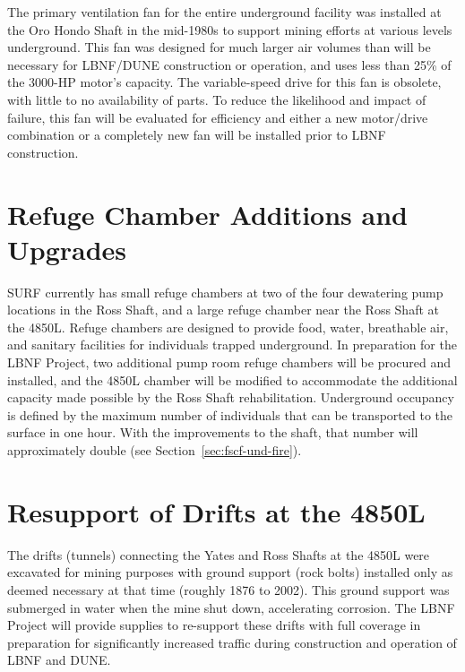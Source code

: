 The primary ventilation fan for the entire underground facility was installed at the Oro Hondo Shaft in the mid-1980s to support mining efforts at various levels underground.  This fan was designed for much larger air volumes than will be necessary for LBNF/DUNE construction or operation, and uses less than 25\% of the 3000-HP motor's capacity.  The variable-speed drive for this fan is obsolete, with little to no  availability of parts.  To reduce the likelihood and impact of failure, this fan will be evaluated for efficiency and either a new motor/drive combination or a completely new fan will be installed prior to LBNF construction.
 
\section{Refuge Chamber Additions and Upgrades}
\label{ch:fscf-site-prep-refuge}

SURF currently has small refuge chambers at two of the four dewatering pump locations in the Ross Shaft, and a large refuge chamber near the Ross Shaft at the 4850L.  Refuge chambers are designed to provide food, water, breathable air, and sanitary facilities for individuals trapped underground.  In preparation for the LBNF Project, two additional pump room refuge chambers will be procured and installed, and the 4850L chamber will be modified to accommodate the additional capacity made possible by the Ross Shaft rehabilitation.  Underground occupancy is defined by the maximum number of individuals that can be transported to the surface in one hour.  With the improvements to the shaft, that number will approximately double (see Section~\ref{sec:fscf-und-fire}).
 
\section{Resupport of Drifts at the 4850L}
\label{ch:fscf-site-prep-ground}

The drifts (tunnels) connecting the Yates and Ross Shafts at the 4850L were excavated for mining purposes with ground support (rock bolts) installed only as deemed necessary at that time (roughly 1876 to 2002).  This ground support was submerged in water when the mine shut down, accelerating corrosion.  The LBNF Project will provide supplies to re-support these drifts with full coverage in preparation for significantly increased traffic during construction and operation of LBNF and DUNE.
 
